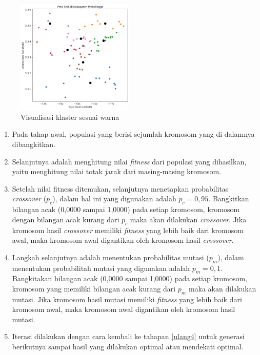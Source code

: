 \begin{figure}[H]
	\centering
	\includegraphics[width=0.5\textwidth]{Gambar/hasil klaster.png}
	\caption{Visualisasi klaster sesuai warna}
	\label{fig:hasilklas}
\end{figure}

\begin{enumerate}
	\item Pada tahap awal, populasi yang berisi sejumlah kromosom yang di dalamnya dibangkitkan.
	\item \label{ulang4} Selanjutnya adalah menghitung nilai \textit{fitness} dari populasi yang dihasilkan, yaitu menghitung nilai totak jarak dari masing-masing kromosom.
	\item Setelah nilai fitness ditemukan, selanjutnya menetapkan probabilitas \textit{crossover} ($p_c$), dalam hal ini yang digunakan adalah $p_c=0,95$. Bangkitkan bilangan acak (0,0000 sampai 1,0000) pada setiap kromosom, kromosom dengan bilangan acak kurang dari $p_c$ maka akan dilakukan \textit{crossover}. Jika kromosom hasil \textit{crossover} memiliki \textit{fitness} yang lebih baik  dari kromosom awal, maka kromosom awal digantikan oleh kromosom hasil \textit{crossover}.
	\item Langkah selanjutnya adalah menentukan probabilitas mutasi ($p_m$), dalam menentukan probabilitah mutasi yang digunakan adalah $p_m=0,1$. Bangkitakan bilangan acak (0,0000 sampai 1,0000) pada setiap kromosom, kromosom yang memiliki bilangan acak kurang dari $p_m$ maka akan dilakukan mutasi. Jika kromosom hasil mutasi memiliki \textit{fitness} yang lebih baik dari kromosom awal, maka kromosom awal digantikan oleh kromosom hasil mutasi.
	\item Iterasi dilakukan dengan cara kembali ke tahapan \ref{ulang4} untuk generasi berikutnya sampai hasil yang dilakukan optimal atau mendekati optimal.
\end{enumerate}

